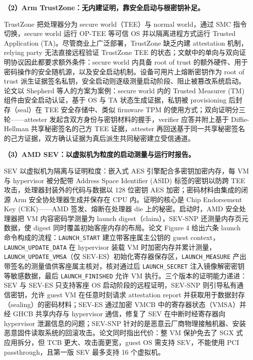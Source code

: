 \documentclass[11pt]{ctexart}
\begin{document}
\noindent\textbf{（2）Arm TrustZone：无内建证明，靠安全启动与根密钥补足。}\par
TrustZone 把处理器分为 secure world（TEE）与 normal world，通过 SMC 指令切换，secure world 运行 OP-TEE 等可信 OS 并以隔离进程方式运行 Trusted Application (TA)。尽管商业上广泛部署，TrustZone 缺乏内建 attestation 机制，relying party 无法直接远程验证 TrustZone TEE 的状态；文献中的单向与双向证明协议因此都要求额外条件：secure world 内具备 root of trust 的额外硬件、用于密码操作的安全随机源，以及安全启动机制。设备可用片上熔断密钥作为 root of trust 派生证据签名私钥，安全启动则逐级测量启动阶段、阻止被篡改系统启动。论文以 Shepherd 等人的方案为案例：secure world 内的 Trusted Measurer (TM) 组件由安全启动认证，基于 OS 与 TA 状态生成证据，私钥被 provisioning 后封存（seal）在 TEE 安全存储中、类似 firmware TPM 的使用方式；双向证明分三轮——attester 发起含双方身份与密钥材料的握手，verifier 应答并附上基于 Diffie-Hellman 共享秘密签名的己方 TEE 证据，attester 再回送基于同一共享秘密签名的己方证据，双方确认证据为真后派生共同秘密建立受信通道。\par
\noindent\textbf{（3）AMD SEV：以虚拟机为粒度的启动测量与运行时报告。}\par
SEV 以虚拟机为隔离与证明粒度：嵌入式 AES 引擎配合多密钥加密内存，每 VM 与 hypervisor 被分配带 Address Space Identifier (ASID) 标签的密钥以防跨 TEE 攻击，处理器封装外的代码与数据以 128 位密钥 AES 加密；密码材料由集成的闭源 Arm 安全协处理器生成并保存在 CPU 内。证明的核心是 Chip Endorsement Key (CEK)——AMD 签发、熔断在处理器 die 上的秘密。启动时，AMD 安全处理器把 VM 内容密码学测量为 launch digest（claim），SEV-SNP 还测量内存页元数据，使 digest 同时覆盖初始客座内存的布局。论文 Figure 4 给出六条 launch 命令构成的流程：\texttt{LAUNCH\_START} 建立带客座属主公钥的 guest context，\texttt{LAUNCH\_UPDATE\_DATA} 在 hypervisor 装载 VM 时加密内存并累计测量，\texttt{LAUNCH\_UPDATE\_VMSA}（仅 SEV-ES）初始化寄存器保存区，\texttt{LAUNCH\_MEASURE} 产出带签名的测量值供客座属主核对，核对通过后 \texttt{LAUNCH\_SECRET} 注入镜像解密密钥等敏感数据，最后 \texttt{LAUNCH\_FINISHED} 允许 VM 执行。三个版本的证明能力递进：SEV 与 SEV-ES 只支持客座 OS 启动阶段的远程证明，SEV-SNP 则引导私有通信密钥，允许 guest VM 在任意时刻请求 attestation report 并获取用于数据封存（sealing）的密码材料；SEV-ES 通过加密 VMCB 中的寄存器状态（VMSA）并经 GHCB 共享内存与 hypervisor 通信，修复了 SEV 在中断时经寄存器向 hypervisor 泄漏信息的问题；SEV-SNP 针对的是恶意云厂商物理接触机器、安装恶意固件读取系统的回滚攻击。论文同时指出代价：整 VM 保护免去了 SGX 式应用拆分，但 TCB 更大、攻击面更宽，guest OS 需支持 SEV，不能使用 PCI passthrough，且第一版 SEV 最多支持 16 个虚拟机。\par
\end{document}
